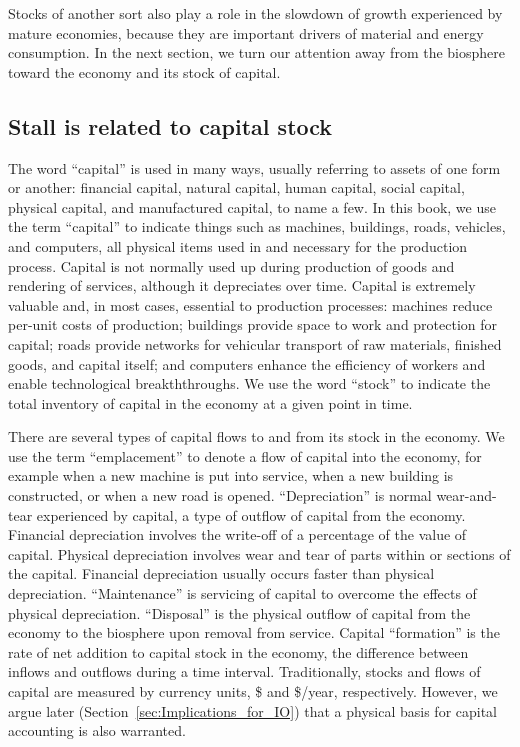 Stocks of another sort also play a role 
in the slowdown of growth experienced by mature economies,
because they  are important drivers of material and energy consumption.
In the next section, we turn our attention 
away from the biosphere 
toward the economy and its stock of capital.





\subsection{Stall is related to capital stock}
\label{sec:stall_capital_stock}

The word ``capital'' is used in many ways, usually referring to assets
of one form or another: 
financial capital, 
natural capital, 
human capital, 
social capital,
physical capital, and
manufactured capital, 
to name a few.
In this book, 
we use the term ``capital'' to indicate things such as
machines, 
buildings, 
roads,
vehicles, and
computers,
all physical items used in and necessary for the production process.
Capital is not normally used up during production 
of goods and rendering of services, 
although it depreciates over time.
Capital is extremely valuable and, in most cases, essential to production processes:
machines reduce per-unit costs of production;
buildings provide space to work and protection for capital;
roads provide networks for vehicular transport 
of raw materials, finished goods, and capital itself; and
computers enhance the efficiency of workers and enable technological breakththroughs.
We use the word ``stock'' to indicate the total inventory of capital 
in the economy at a given point in time.

There are several types of capital flows
to and from its stock in the economy.
We use the term ``emplacement'' to denote a flow of capital into
the economy, for example when a new machine is put into service,
when a new building is constructed, or
when a new road is opened.
``Depreciation'' is normal wear-and-tear experienced by capital, 
a type of outflow of capital from the economy.
Financial depreciation involves the write-off of a percentage 
of the value of capital.
Physical depreciation involves wear and tear of parts within or sections of the capital.
Financial depreciation usually occurs faster than physical depreciation.
``Maintenance'' is servicing of capital to overcome the effects of physical depreciation.
``Disposal'' is the physical outflow of capital from the economy to the biosphere
upon removal from service.
Capital ``formation'' is the rate of net
addition to capital stock in the economy,
the difference between inflows and outflows
during a time interval.
Traditionally, stocks and flows of capital are measured by currency units, 
\$ and \$/year, respectively.
However, we argue later (Section~\ref{sec:Implications_for_IO})
that a physical basis for capital accounting is also warranted.

